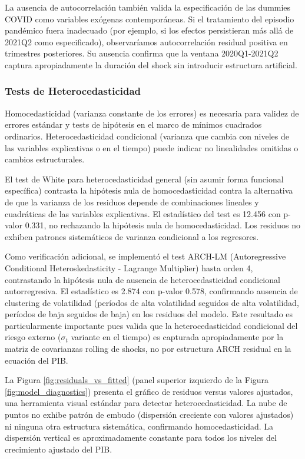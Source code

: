 \documentclass[3p,11pt,draft,natbib=false]{elsarticle}
\begin{document}
La ausencia de autocorrelación también valida la especificación de las dummies COVID como variables exógenas contemporáneas. Si el tratamiento del episodio pandémico fuera inadecuado (por ejemplo, si los efectos persistieran más allá de 2021Q2 como especificado), observaríamos autocorrelación residual positiva en trimestres posteriores. Su ausencia confirma que la ventana 2020Q1-2021Q2 captura apropiadamente la duración del shock sin introducir estructura artificial.

\subsubsection{Tests de Heterocedasticidad}

Homocedasticidad (varianza constante de los errores) es necesaria para validez de errores estándar y tests de hipótesis en el marco de mínimos cuadrados ordinarios. Heterocedasticidad condicional (varianza que cambia con niveles de las variables explicativas o en el tiempo) puede indicar no linealidades omitidas o cambios estructurales.

El test de White para heterocedasticidad general (sin asumir forma funcional específica) contrasta la hipótesis nula de homocedasticidad contra la alternativa de que la varianza de los residuos depende de combinaciones lineales y cuadráticas de las variables explicativas. El estadístico del test es 12.456 con p-valor 0.331, no rechazando la hipótesis nula de homocedasticidad. Los residuos no exhiben patrones sistemáticos de varianza condicional a los regresores.

Como verificación adicional, se implementó el test ARCH-LM (Autoregressive Conditional Heteroskedasticity - Lagrange Multiplier) hasta orden 4, contrastando la hipótesis nula de ausencia de heterocedasticidad condicional autorregresiva. El estadístico es 2.874 con p-valor 0.578, confirmando ausencia de clustering de volatilidad (períodos de alta volatilidad seguidos de alta volatilidad, períodos de baja seguidos de baja) en los residuos del modelo. Este resultado es particularmente importante pues valida que la heterocedasticidad condicional del riesgo externo ($\sigma_t$ variante en el tiempo) es capturada apropiadamente por la matriz de covarianzas rolling de shocks, no por estructura ARCH residual en la ecuación del PIB.

La Figura \ref{fig:residuals_vs_fitted} (panel superior izquierdo de la Figura \ref{fig:model_diagnostics}) presenta el gráfico de residuos versus valores ajustados, una herramienta visual estándar para detectar heterocedasticidad. La nube de puntos no exhibe patrón de embudo (dispersión creciente con valores ajustados) ni ninguna otra estructura sistemática, confirmando homocedasticidad. La dispersión vertical es aproximadamente constante para todos los niveles del crecimiento ajustado del PIB.
\end{document}
